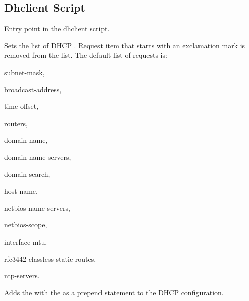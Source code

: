 \subsection{Dhclient Script}



Entry point in the dhclient script.


Sets the list of DHCP . Request item that starts with an 
exclamation mark \qcode{!} is removed from the list. The default list
of requests is: 
\begin{inparaitem}[]
\item subnet-mask,
\item broadcast-address,
\item time-offset,
\item routers,
\item domain-name,
\item domain-name-servers,
\item domain-search,
\item host-name,
\item netbios-name-servers,
\item netbios-scope,
\item interface-mtu,
\item rfc3442-classless-static-routes,
\item ntp-servers.
\end{inparaitem}


Adds the  with the  as a prepend statement 
to the DHCP configuration.

